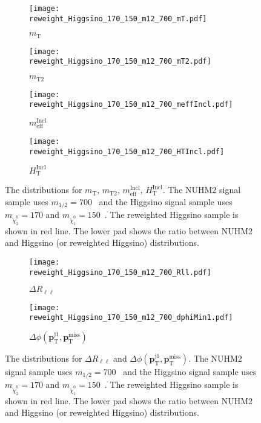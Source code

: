 \begin{figure}[htbp]
    \begin{center}
        \begin{subfigure}[b]{0.48\textwidth}
            \texttt{[image: reweight\_Higgsino\_170\_150\_m12\_700\_mT.pdf]}
            \caption{$m_\mathrm{T}$}
        \end{subfigure}
        \begin{subfigure}[b]{0.48\textwidth}
            \texttt{[image: reweight\_Higgsino\_170\_150\_m12\_700\_mT2.pdf]}
            \caption{$m_\mathrm{T2}$}
        \end{subfigure}
        \begin{subfigure}[b]{0.48\textwidth}
            \texttt{[image: reweight\_Higgsino\_170\_150\_m12\_700\_meffIncl.pdf]}
            \caption{$m^\mathrm{Incl}_\mathrm{eff}$}
        \end{subfigure}
        \begin{subfigure}[b]{0.48\textwidth}
            \texttt{[image: reweight\_Higgsino\_170\_150\_m12\_700\_HTIncl.pdf]}
            \caption{$H^\mathrm{Incl}_\mathrm{T}$}
        \end{subfigure}
    \end{center}
    \caption{The distributions for $m_\mathrm{T}$, $m_\mathrm{T2}$, $m^\mathrm{Incl}_\mathrm{eff}$, $H^\mathrm{Incl}_\mathrm{T}$.
    The NUHM2 signal sample uses  $m_{1/2} = 700$~{\GeV} and the Higgsino signal sample uses $m_{\widetilde{\chi}^{0}_{2}} = 170$ and $m_{\widetilde{\chi}^{0}_{1}} = 150$~{\GeV}.
    The reweighted Higgsino sample is shown in red line.
    The lower pad shows the ratio between NUHM2 and Higgsino (or reweighted Higgsino) distributions.}
    \label{fig:results_nuhm2_reweighting_validation_4}
\end{figure}

\begin{figure}[htbp]
    \begin{center}
        \begin{subfigure}[b]{0.48\textwidth}
            \texttt{[image: reweight\_Higgsino\_170\_150\_m12\_700\_Rll.pdf]}
            \caption{$\Delta R_{\ell \ell}$}
        \end{subfigure}
        \begin{subfigure}[b]{0.48\textwidth}
            \texttt{[image: reweight\_Higgsino\_170\_150\_m12\_700\_dphiMin1.pdf]}
            \caption{$\Delta \phi(\mathbf{p}^\mathrm{j1}_\mathrm{T}, \mathbf{p}^\mathrm{miss}_\mathrm{T})$}
        \end{subfigure}
    \end{center}
    \caption{The distributions for $\Delta R_{\ell \ell}$ and $\Delta \phi(\mathbf{p}^\mathrm{j1}_\mathrm{T}, \mathbf{p}^\mathrm{miss}_\mathrm{T})$.
    The NUHM2 signal sample uses  $m_{1/2} = 700$~{\GeV} and the Higgsino signal sample uses $m_{\widetilde{\chi}^{0}_{2}} = 170$ and $m_{\widetilde{\chi}^{0}_{1}} = 150$~{\GeV}.
    The reweighted Higgsino sample is shown in red line.
    The lower pad shows the ratio between NUHM2 and Higgsino (or reweighted Higgsino) distributions.}
    \label{fig:results_nuhm2_reweighting_validation_5}
\end{figure}

